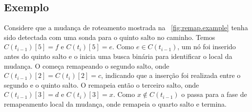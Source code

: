 \subsection{Exemplo}

Considere que a mudança de roteamento mostrada na
\figstr~\ref{fig:remap.example} tenha sido detectada com uma sonda para
o quinto salto no caminho.  Temos $C(t_{i-1})[5] = f$ e $C(t_i)[5] = e$.
Como $e \in C(t_{i-1})$, um nó foi inserido antes do quinto salto e o
\rmprt{} inicia uma busca binária para identificar o local da mudança.
O \rmprt{} começa remapeando o segundo salto, onde $C(t_{i-1})[2] =
C(t_i)[2] = c$, indicando que a inserção foi realizada entre o segundo e
o quinto salto.  O \rmprt{} remapeia então o terceiro salto, onde
$C(t_{i-1})[3] = d$ e $C(t_i)[3] = x$.  Como $x \notin C(t_{i-1})$ o
\rmprt{} passa para a fase de remapeamento local da mudança, onde
remapeia o quarto salto e termina.
